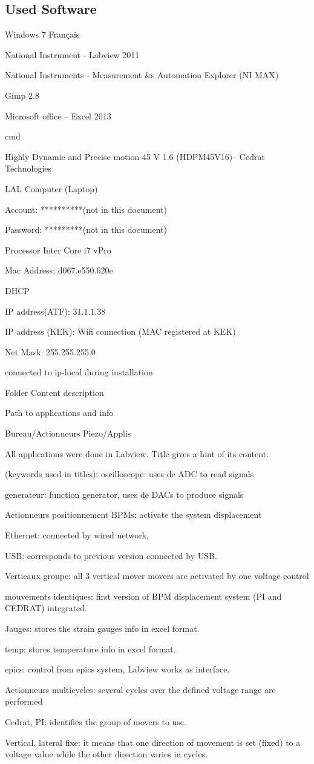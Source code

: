 \subsection{Used Software}
Windows 7 Français\par
National Instrument - Labview 2011\par
National Instruments - Measurement $\&$s Automation Explorer (NI MAX)\par
Gimp 2.8\par
Microsoft office – Excel 2013\par
cmd\par
Highly Dynamic and Precise motion 45 V 1.6 (HDPM45V16)– Cedrat Technologies\par
LAL Computer (Laptop)\par
Account: **********(not in this document)\par
Password: *********(not in this document)\par
Processor Inter Core i7 vPro\par
Mac Address: d067.e550.620e\par
DHCP\par
IP address(ATF): 31.1.1.38\par
IP address (KEK): Wifi connection (MAC registered at KEK)\par
Net Mask: 255.255.255.0\par
connected to ip-local during installation\par
Folder Content description\par
Path to applications and info\par
Bureau/Actionneurs Piezo/Applis\par
All applications were done in Labview. Title gives a hint of its content:\par
	(keywords used in titles):
oscilloscope: uses de ADC to read signals\par
generateur: function generator, uses de DACs to produce signals\par
Actionneurs positionnement BPMs: activate the system displacement\par
Ethernet: connected by wired network,\par
USB: corresponds to previous version connected by USB.\par
Verticaux groupe: all 3 vertical mover movers are activated by one voltage control\par
 mouvements identiques: first version of BPM displacement system (PI and CEDRAT) integrated.\par
Jauges: stores the strain gauges info in excel format.\par
temp: stores temperature info in excel format.\par
epics: control from epics system, Labview works as interface.\par
Actionneurs multicycles: several cycles over the defined voltage range are performed\par
Cedrat, PI: identifies the group of movers to use.\par
Vertical, lateral fixe: it means that one direction of movement is set (fixed) to a voltage value while the other direction varies in cycles.\par

